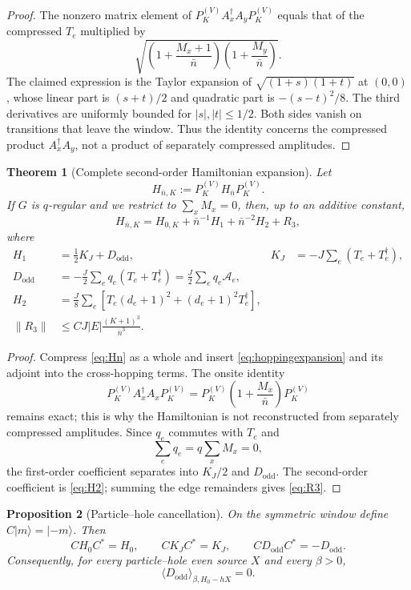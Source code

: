 \documentclass[11pt]{article}
\newtheorem{theorem}{Theorem}[section]
\newtheorem{proposition}[theorem]{Proposition}
\newcommand{\nbar}{\bar n}
\newcommand{\cA}{\mathcal A}
\begin{document}
\begin{proof}
The nonzero matrix element of $P_K^{(V)}A_x^\dagger A_yP_K^{(V)}$ equals that of the compressed $T_e$ multiplied by
\[
\sqrt{\left(1+\frac{M_x+1}{\nbar}\right)\left(1+\frac{M_y}{\nbar}\right)}.
\]
The claimed expression is the Taylor expansion of $\sqrt{(1+s)(1+t)}$ at $(0,0)$, whose linear part is $(s+t)/2$ and quadratic part is $-(s-t)^2/8$. The third derivatives are uniformly bounded for $|s|,|t|\le1/2$. Both sides vanish on transitions that leave the window. Thus the identity concerns the compressed product $A_x^\dagger A_y$, not a product of separately compressed amplitudes.
\end{proof}

\begin{theorem}[Complete second-order Hamiltonian expansion]
Let
\[
H_{\nbar,K}:=P_K^{(V)}H_{\nbar}P_K^{(V)}.
\]
If $G$ is $q$-regular and we restrict to $\sum_xM_x=0$, then, up to an additive constant,
\begin{equation}
H_{\nbar,K}=H_{0,K}+\nbar^{-1}H_1+\nbar^{-2}H_2+R_3,
\label{eq:normalform}
\end{equation}
where
\begin{align}
H_1&=\frac12K_J+D_{\mathrm{odd}},
&K_J&=-J\sum_e(T_e+T_e^\dagger),
\label{eq:H1}\\
D_{\mathrm{odd}}
&=-\frac J2\sum_eq_e(T_e+T_e^\dagger)
=\frac J2\sum_eq_e\cA_e,
\label{eq:Dodd}\\
H_2&=\frac J8\sum_e\left[T_e(d_e+1)^2+(d_e+1)^2T_e^\dagger\right],
\label{eq:H2}\\
\|R_3\|&\le CJ|E|\frac{(K+1)^3}{\nbar^3}.
\label{eq:R3}
\end{align}
\end{theorem}

\begin{proof}
Compress \eqref{eq:Hn} as a whole and insert \eqref{eq:hoppingexpansion} and its adjoint into the cross-hopping terms. The onsite identity
\[
P_K^{(V)}A_x^\dagger A_xP_K^{(V)}
=P_K^{(V)}\left(1+\frac{M_x}{\nbar}\right)P_K^{(V)}
\]
remains exact; this is why the Hamiltonian is not reconstructed from separately compressed amplitudes. Since $q_e$ commutes with $T_e$ and
\[
\sum_eq_e=q\sum_xM_x=0,
\]
the first-order coefficient separates into $K_J/2$ and $D_{\mathrm{odd}}$. The second-order coefficient is \eqref{eq:H2}; summing the edge remainders gives \eqref{eq:R3}.
\end{proof}

\begin{proposition}[Particle--hole cancellation]
On the symmetric window define $C\lvert m\rangle=\lvert-m\rangle$. Then
\[
CH_0C^*=H_0,
\qquad
CK_JC^*=K_J,
\qquad
CD_{\mathrm{odd}}C^*=-D_{\mathrm{odd}}.
\]
Consequently, for every particle--hole even source $X$ and every $\beta>0$,
\begin{equation}
\langle D_{\mathrm{odd}}\rangle_{\beta,H_0-hX}=0.
\label{eq:phcancellation}
\end{equation}
\end{proposition}
\end{document}
